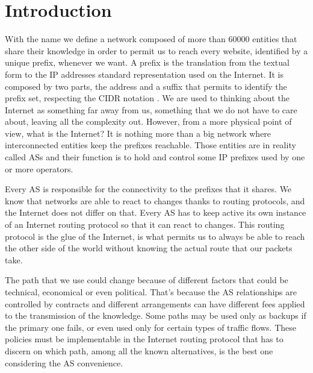 \chapter{Introduction}
\label{cha:introduction}



With the name  we define a network composed of more than \num{60000}
entities that share their knowledge in order to permit us to reach every website,
identified by a unique prefix, whenever we want.
A prefix is the translation from the textual form to the \ac{IP} addresses
standard representation used on the Internet.
It is composed by two parts, the address and a suffix that permits to identify the
prefix set, respecting the \ac{CIDR} notation \cite{fuller1993classless}.
We are used to thinking about the Internet as something far away from us, something
that we do not have to care about, leaving all the complexity
out.
However, from a more physical point of view, what is the Internet? It is nothing
more than a big network where interconnected entities keep the prefixes reachable.
Those entities are in reality called \acp{AS} and their function is to hold and
control some \ac{IP} prefixes used by one or more operators.

Every \ac{AS} is responsible for the connectivity to the prefixes that it shares.
We know that networks are able to react to changes thanks to routing protocols,
and the Internet does not differ on that.
Every \ac{AS} has to keep active its own instance of an Internet routing protocol
so that it can react to changes.
This routing protocol is the glue of the Internet, is what permits
us to always be able to reach the other side of the world without knowing
the actual route that our packets take.

The path that we use could change because of different factors that could
be technical, economical or even political.
That's because the \ac{AS} relationships are controlled by contracts and different
arrangements can have different fees applied to the transmission of the knowledge.
Some paths may be used only as backups if the primary one fails, or even used
only for certain types of traffic flows.
These policies must be implementable in the Internet routing protocol that has
to discern on which path, among all the known alternatives, is the best one
considering the \ac{AS} convenience.

